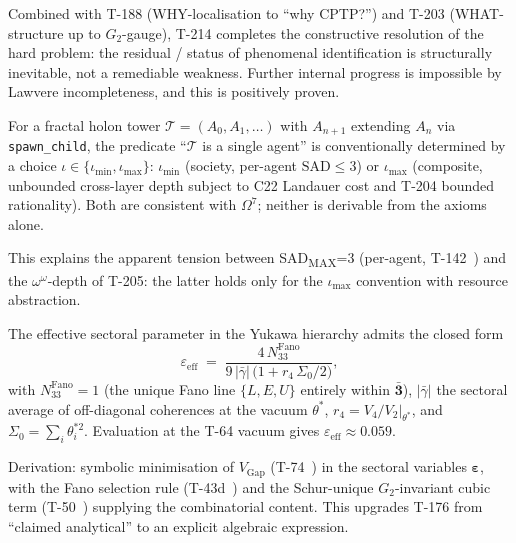 Combined with T-188 (WHY-localisation to ``why CPTP?'') and T-203
(WHAT-structure up to $G_2$-gauge), T-214 completes the constructive
resolution of the hard problem: the residual / status
of phenomenal identification is structurally inevitable, not
a remediable weakness. Further internal progress is impossible by
Lawvere incompleteness, and this is positively proven.

\begin{theorembox}
\label{thm:t215-cross-layer}
For a fractal holon tower $\mathcal T = (A_0, A_1, \ldots)$ with
$A_{n+1}$ extending $A_n$ via \texttt{spawn\_child}, the predicate
``$\mathcal T$ is a single agent'' is conventionally determined by a
choice $\iota \in \{\iota_{\min}, \iota_{\max}\}$: $\iota_{\min}$
(society, per-agent $\mathrm{SAD} \leq 3$) or $\iota_{\max}$
(composite, unbounded cross-layer depth subject to C22 Landauer
cost and T-204 bounded rationality). Both are consistent with
$\Omega^7$; neither is derivable from the axioms alone.
\end{theorembox}

This explains the apparent tension between SAD\textsubscript{MAX}=3
(per-agent, T-142~) and the $\omega^\omega$-depth of T-205:
the latter holds only for the $\iota_{\max}$ convention with
resource abstraction.

\begin{theorembox}
\label{thm:t216-eps-eff}
The effective sectoral parameter in the Yukawa hierarchy admits the
closed form
\[
  \varepsilon_{\mathrm{eff}} \;=\;
  \frac{4\, N_{33}^{\mathrm{Fano}}}
       {9\, |\bar\gamma|\,\bigl(1 + r_4\,\Sigma_0/2\bigr)},
\]
with $N_{33}^{\mathrm{Fano}} = 1$ (the unique Fano line
$\{L, E, U\}$ entirely within $\bar{\mathbf 3}$), $|\bar\gamma|$ the
sectoral average of off-diagonal coherences at the vacuum $\theta^*$,
$r_4 = V_4/V_2|_{\theta^*}$, and $\Sigma_0 = \sum_i \theta_i^{*2}$.
Evaluation at the T-64 vacuum gives
$\varepsilon_{\mathrm{eff}} \approx 0.059$.
\end{theorembox}

Derivation: symbolic minimisation of $V_{\mathrm{Gap}}$ (T-74~)
in the sectoral variables $\boldsymbol\varepsilon$, with the Fano
selection rule (T-43d~) and the Schur-unique $G_2$-invariant
cubic term (T-50~) supplying the combinatorial content.
This upgrades T-176 from ``claimed analytical'' to an explicit algebraic
expression.

